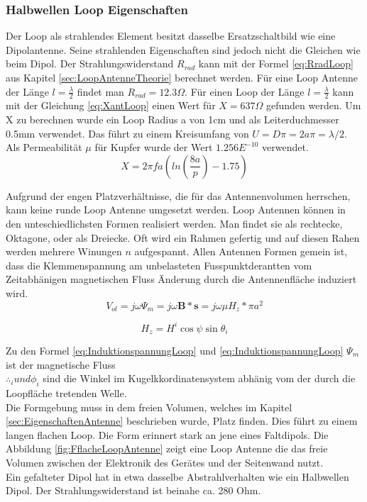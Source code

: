 \subsubsection{Halbwellen Loop Eigenschaften}
Der Loop als strahlendes Element besitzt dasselbe Ersatzschaltbild wie eine Dipolantenne. Seine strahlenden Eigenschaften sind jedoch nicht die Gleichen wie beim Dipol. Der Strahlungswiderstand $R_{rad}$ kann mit der Formel \ref{eq:RradLoop} aus Kapitel \ref{sec:LoopAntenneTheorie} berechnet werden. Für eine Loop Antenne der Länge $l=\frac{\lambda}{2}$ findet man $R_{rad} = 12.3\Omega$. Für einen Loop der Länge $l=\frac{\lambda}{2}$ kann mit der Gleichung \ref{eq:XantLoop} einen Wert für $X = 637 \Omega$ gefunden werden. Um X zu berechnen wurde ein Loop Radius a von 1cm und als Leiterduchmesser 0.5mm verwendet. Das führt zu einem Kreisumfang von $U=D\pi=2a\pi=\lambda /2$. Als Permeabilität $\mu $ für Kupfer wurde der Wert $1.256E^{-10}$ verwendet.
\begin{equation}\label{eq:XantLoop}
X= 2\pi f a(ln \left( \frac{8a}{p} \right) - 1.75)
\end{equation}

Aufgrund der engen Platzverhältnisse, die für das Antennenvolumen herrschen, kann keine runde Loop Antenne umgesetzt werden. Loop Antennen können in den unteschiedlichsten Formen realisiert werden. Man findet sie als rechtecke, Oktagone, oder als Dreiecke. Oft wird ein Rahmen gefertig und auf diesen Rahen werden mehrere Winungen $n$ aufgespannt. Allen Antennen Formen gemein ist, dass die Klemmenspannung am unbelasteten Fusspunktderantten vom Zeitabhänigen magnetischen Fluss Änderung durch die Antennenfläche induziert wird.
\begin{equation}\label{eq:InduktionspannungLoop}
V_{ol}= j\omega\Psi_{m}=j\omega\textbf{B}*\textbf{s}= j\omega\mu H_{z}*\pi a^{2}
\end{equation}

\begin{equation}\label{eq:InduktionspannungLoop}
H_{z}=H^{i}\cos\psi\sin\theta_{i}
\end{equation}

Zu den Formel \ref{eq:InduktionspannungLoop} und \ref{eq:InduktionspannungLoop} 
$\Psi_{m}$ ist der magnetische Fluss\\
$\therefore_{i} und \phi_{i}$ sind die Winkel im Kugelkkordinatensystem abhänig vom der durch die Loopfläche tretenden Welle.
 \\ 
Die Formgebung muss in dem freien Volumen, welches im Kapitel \ref{sec:EigenschaftenAntenne} beschrieben wurde, Platz finden. Dies führt zu einem langen flachen Loop. Die Form erinnert stark an jene eines Faltdipols. Die Abbildung \ref{fig:FflacheLoopAntenne} zeigt eine Loop Antenne die das freie Volumen zwischen der Elektronik des Gerätes und der Seitenwand nutzt.\\
Ein gefalteter Dipol hat in etwa dasselbe Abstrahlverhalten wie ein Halbwellen Dipol. Der Strahlungswiderstand ist beinahe  ca.  280 Ohm. 


